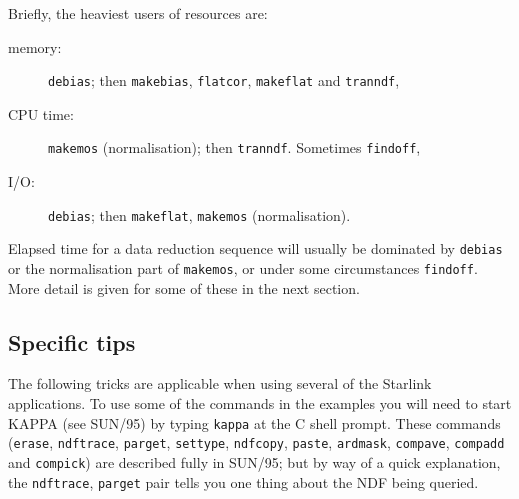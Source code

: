 \documentclass[twoside,11pt]{article}
\newcommand{\xref}[3]{#1}
\newcommand{\xlabel}[1]{}
\begin{document}
Briefly, the heaviest users of resources are:

\begin{description}

  \item[memory:] {\tt debias}; then {\tt makebias}, {\tt flatcor},
   {\tt makeflat} and {\tt tranndf},

  \item[CPU time:] {\tt makemos} (normalisation); then {\tt tranndf}.
   Sometimes {\tt findoff},

  \item[I/O:] {\tt debias}; then {\tt makeflat}, {\tt makemos}
   (normalisation).

\end{description}

Elapsed time for a data reduction sequence will usually be dominated by
{\tt debias} or the normalisation part of {\tt makemos}, or under some
circumstances {\tt findoff}.
More detail is given for some of these in the next section.

\subsection{\xlabel{LARGE-SPECIFIC}Specific tips}

The following tricks are applicable when using several of the
Starlink applications.
To use some of the commands in the examples you will need to start KAPPA
(see \xref{SUN/95}{sun95}{}\/\cite{SUN95}) by typing {\tt kappa} at the
C shell prompt.
These commands
(\xref{{\tt erase}}{sun95}{ERASE},
\xref{{\tt ndftrace}}{sun95}{NDFTRACE},
\xref{{\tt parget}}{sun95}{PARGET},
\xref{{\tt settype}}{sun95}{SETTYPE},
\xref{{\tt ndfcopy}}{sun95}{NDFCOPY},
\xref{{\tt paste}}{sun95}{PASTE},
\xref{{\tt ardmask}}{sun95}{ARDMASK},
\xref{{\tt compave}}{sun95}{COMPAVE},
\xref{{\tt compadd}}{sun95}{COMPADD} and
\xref{{\tt compick}}{sun95}{COMPICK})
are described fully in \xref{SUN/95}{sun95}{}; but by way of a quick
explanation, the {\tt ndftrace}, {\tt parget} pair tells you one thing
about the NDF being queried.
\end{document}
